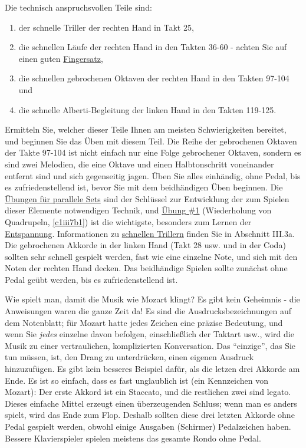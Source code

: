 Die technisch anspruchsvollen Teile sind:

\begin{enumerate}[label={\arabic*.}] 
 \item der schnelle Triller der rechten Hand in Takt 25,
 \item die schnellen Läufe der rechten Hand in den Takten 36-60 - achten Sie auf einen guten \hyperref[c1ii18]{Fingersatz},
 \item die schnellen gebrochenen Oktaven der rechten Hand in den Takten 97-104 und 
 \item die schnelle Alberti-Begleitung der linken Hand in den Takten 119-125.
 \end{enumerate}

Ermitteln Sie, welcher dieser Teile Ihnen am meisten Schwierigkeiten bereitet, und beginnen Sie das Üben mit diesem Teil.
Die Reihe der gebrochenen Oktaven der Takte 97-104 ist nicht einfach nur eine Folge gebrochener Oktaven, sondern es sind zwei Melodien, die eine Oktave und einen Halbtonschritt voneinander entfernt sind und sich gegenseitig jagen.
Üben Sie alles einhändig, ohne Pedal, bis es zufriedenstellend ist, bevor Sie mit dem beidhändigen Üben beginnen.
Die \hyperref[c1iii7b]{Übungen für parallele Sets} sind der Schlüssel zur Entwicklung der zum Spielen dieser Elemente notwendigen Technik, und \hyperref[c1iii7b1]{Übung \#1} (Wiederholung von Quadrupeln, \ref*{c1iii7b1}) ist die wichtigste, besonders zum Lernen der \hyperref[c1ii14]{Entspannung}.
Informationen zu \hyperref[c1iii3]{schnellen Trillern} finden Sie in Abschnitt III.3a.
Die gebrochenen Akkorde in der linken Hand (Takt 28 usw. und in der Coda) sollten sehr schnell gespielt werden, fast wie eine einzelne Note, und sich mit den Noten der rechten Hand decken.
Das beidhändige Spielen sollte zunächst ohne Pedal geübt werden, bis es zufriedenstellend ist.

Wie spielt man, damit die Musik wie Mozart klingt?
Es gibt kein Geheimnis - die Anweisungen waren die ganze Zeit da!
Es sind die Ausdrucksbezeichnungen auf dem Notenblatt; für Mozart hatte jedes Zeichen eine präzise Bedeutung, und wenn Sie \textit{jedes} einzelne davon befolgen, einschließlich der Taktart usw., wird die Musik zu einer vertraulichen, komplizierten Konversation.
Das \enquote{einzige}, das Sie tun müssen, ist, den Drang zu unterdrücken, einen eigenen Ausdruck hinzuzufügen.
Es gibt kein besseres Beispiel dafür, als die letzen drei Akkorde am Ende.
Es ist so einfach, dass es fast unglaublich ist (ein Kennzeichen von Mozart): Der erste Akkord ist ein Staccato, und die restlichen zwei sind legato.
Dieses einfache Mittel erzeugt einen überzeugenden Schluss; wenn man es anders spielt, wird das Ende zum Flop.
Deshalb sollten diese drei letzten Akkorde ohne Pedal gespielt werden, obwohl einige Ausgaben (Schirmer) Pedalzeichen haben.
Bessere Klavierspieler spielen meistens das gesamte Rondo ohne Pedal.

